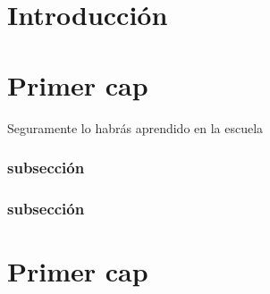 \documentclass[a4paper]{book}
\begin{document}
\tableofcontents
\newpage
\begingroup
\renewcommand*{\addvspace}[1]{}%
\listoffigures
\newpage
\listoftables
\endgroup

\listoffigures
\newpage
\listoftables

\chapter*{Introducción}

\lipsum[2]
\chapter{Primer
cap}
Seguramente lo habrás aprendido en la escuela
\lipsum[1-3]

\subsection{subsección}
\subsection*{subsección}
\lipsum[1-8]

{}


\appendix
\chapter{Primer
cap}
\end{document}
